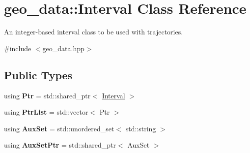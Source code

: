 \hypertarget{classgeo__data_1_1Interval}{}\section{geo\+\_\+data\+:\+:Interval Class Reference}
\label{classgeo__data_1_1Interval}


An integer-\/based interval class to be used with trajectories.  




{\ttfamily \#include $<$geo\+\_\+data.\+hpp$>$}

\subsection*{Public Types}
\begin{DoxyCompactItemize}
\item 
using {\bfseries Ptr} = std\+::shared\+\_\+ptr$<$ \hyperlink{classgeo__data_1_1Interval}{Interval} $>$\hypertarget{classgeo__data_1_1Interval_a36abd263b41898cd7253324766eb8445}{}\label{classgeo__data_1_1Interval_a36abd263b41898cd7253324766eb8445}

\item 
using {\bfseries Ptr\+List} = std\+::vector$<$ Ptr $>$\hypertarget{classgeo__data_1_1Interval_a8379b2779f3f02d47379e8b5dc693dd0}{}\label{classgeo__data_1_1Interval_a8379b2779f3f02d47379e8b5dc693dd0}

\item 
using {\bfseries Aux\+Set} = std\+::unordered\+\_\+set$<$ std\+::string $>$\hypertarget{classgeo__data_1_1Interval_aab3ed186003e96d4dee524d9aa34af62}{}\label{classgeo__data_1_1Interval_aab3ed186003e96d4dee524d9aa34af62}

\item 
using {\bfseries Aux\+Set\+Ptr} = std\+::shared\+\_\+ptr$<$ Aux\+Set $>$\hypertarget{classgeo__data_1_1Interval_a123802b451cf0337042034f32e3f3364}{}\label{classgeo__data_1_1Interval_a123802b451cf0337042034f32e3f3364}

\end{DoxyCompactItemize}
